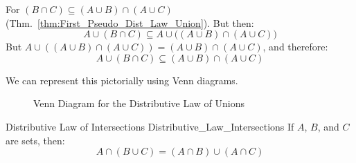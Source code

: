         \begin{bproof}
            For $(B\cap{C})\subseteq(A\cup{B})\cap(A\cup{C})$
            (Thm.~\ref{thm:First_Pseudo_Dist_Law_Union}).
            But then:
            \begin{equation}
                A\cup(B\cap{C})\subseteq
                A\cup\Big((A\cup{B})\cap(A\cup{C})\Big)
            \end{equation}
            But $A\cup((A\cup{B})\cap(A\cup{C}))%
                =(A\cup{B})\cap(A\cup{C})$, and therefore:
            \begin{equation}
                A\cup(B\cap{C})\subseteq
                (A\cup{B})\cap(A\cup{C})
            \end{equation}
        \end{bproof}
        We can represent this pictorially using Venn diagrams.
        \begin{figure}[H]
            \centering
            \captionsetup{type=figure}
            
            \caption{Venn Diagram for the Distributive Law of Unions}
            \label{fig:Venn_Diagram_Distributive_Law_of_Union}
        \end{figure}
        \begin{ftheorem}{Distributive Law of Intersections}
            {Distributive_Law_Intersections}
            If $A$, $B$, and $C$ are sets, then:
            \begin{equation*}
                A\cap(B\cup{C})=(A\cap{B})\cup(A\cap{C})
            \end{equation*}
        \end{ftheorem}
